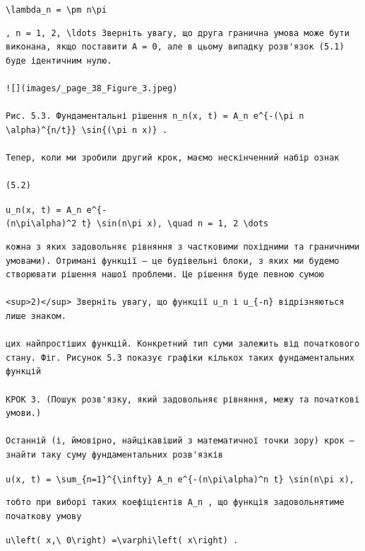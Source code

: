 \documentclass[
  ukrainian,
]{article}
\begin{document}
\texttt{\textbackslash{}lambda\_n\ =\ \textbackslash{}pm\ n\textbackslash{}pi}

\begin{verbatim}
, n = 1, 2, \ldots Зверніть увагу, що друга гранична умова може бути виконана, якщо поставити A = 0, але в цьому випадку розв'язок (5.1) буде ідентичним нулю.

![](images/_page_38_Figure_3.jpeg)

Рис. 5.3. Фундаментальні рішення n_n(x, t) = A_n e^{-(\pi n \alpha)^{n/t}} \sin{(\pi n x)} .

Тепер, коли ми зробили другий крок, маємо нескінченний набір ознак

(5.2)
\end{verbatim}

\texttt{u\_n(x,\ t)\ =\ A\_n\ e\^{}\{-(n\textbackslash{}pi\textbackslash{}alpha)\^{}2\ t\}\ \textbackslash{}sin(n\textbackslash{}pi\ x),\ \textbackslash{}quad\ n\ =\ 1,\ 2\ \textbackslash{}dots}

\begin{verbatim}
кожна з яких задовольняє рівняння з частковими похідними та граничними умовами). Отримані функції — це будівельні блоки, з яких ми будемо створювати рішення нашої проблеми. Це рішення буде певною сумою

<sup>2)</sup> Зверніть увагу, що функції u_n і u_{-n} відрізняються лише знаком.

цих найпростіших функцій. Конкретний тип суми залежить від початкового стану. Фіг. Рисунок 5.3 показує графіки кількох таких фундаментальних функцій

КРОК 3. (Пошук розв'язку, який задовольняє рівняння, межу та початкові умови.)

Останній (і, ймовірно, найцікавіший з математичної точки зору) крок — знайти таку суму фундаментальних розв'язків
\end{verbatim}

\texttt{u(x,\ t)\ =\ \textbackslash{}sum\_\{n=1\}\^{}\{\textbackslash{}infty\}\ A\_n\ e\^{}\{-(n\textbackslash{}pi\textbackslash{}alpha)\^{}n\ t\}\ \textbackslash{}sin(n\textbackslash{}pi\ x),}

\begin{verbatim}
тобто при виборі таких коефіцієнтів A_n , що функція задовольнятиме початкову умову
\end{verbatim}

\texttt{u\textbackslash{}left(\ x,\textbackslash{}\ 0\textbackslash{}right)\ =\textbackslash{}varphi\textbackslash{}left(\ x\textbackslash{}right)\ .}
\end{document}
